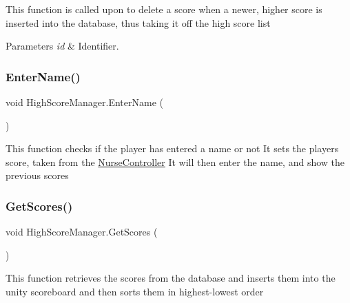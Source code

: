 This function is called upon to delete a score when a newer, higher score is inserted into the database, thus taking it off the high score list 


\begin{DoxyParams}{Parameters}
{\em id} & Identifier.\\
\hline
\end{DoxyParams}
\mbox{\label{class_high_score_manager_a098d1e52bc63ab8c014fa1210d04481e}} 
\subsubsection{\texorpdfstring{Enter\+Name()}{EnterName()}}
{\footnotesize\ttfamily void High\+Score\+Manager.\+Enter\+Name (\begin{DoxyParamCaption}{ }\end{DoxyParamCaption})}



This function checks if the player has entered a name or not It sets the player\textquotesingle{}s score, taken from the \mbox{\hyperlink{class_nurse_controller}{Nurse\+Controller}} It will then enter the name, and show the previous scores 

\mbox{\label{class_high_score_manager_ac0ebc45a4af433ca6f19c06096bd072f}} 
\subsubsection{\texorpdfstring{Get\+Scores()}{GetScores()}}
{\footnotesize\ttfamily void High\+Score\+Manager.\+Get\+Scores (\begin{DoxyParamCaption}{ }\end{DoxyParamCaption})\hspace{0.3cm}{\ttfamily [private]}}



This function retrieves the scores from the database and inserts them into the unity scoreboard and then sorts them in highest-\/lowest order 

\mbox{\label{class_high_score_manager_a45ea58b135c4050aedaad4e12ffadbe3}} 
